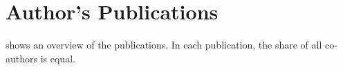\chapter{Author's Publications}




\newcommand{\auth}\textbf
\newcommand{\core}[3]{\href{https://portal.core.edu.au/conf-ranks/#3/}{CORE#1 conference rank: #2}}
\newcommand{\wos}[1]{\href{https://www.webofscience.com/wos/woscc/full-record/WOS:#1}{Web of Science record: #1}}
\newcommand{\citations}[4]{\href{https://scholar.google.com/scholar?cites=#4}{Number of citations\footnote{Source: \href{https://scholar.google.com/}{Google Scholar}. Date extracted: \formatdate{11}{9}{2024}. Excluding self-citations.}\todo{Join duplicate footnotes.}\todo{Unfiy the date format with the rest of the document.}: #2}}

 shows an overview of the publications.
In each publication, the share of all co-authors is equal.

